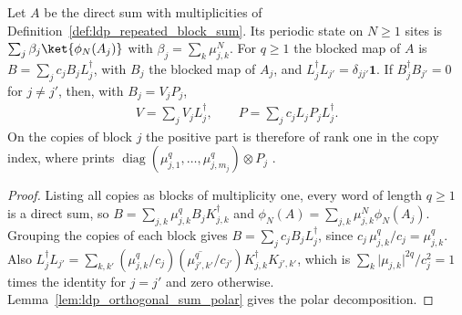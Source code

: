 \begin{lemma}
    \label{thm:ldp_repeated_block_polar}
    \leanok
    Let $A$ be the direct sum with multiplicities of
    Definition~\ref{def:ldp_repeated_block_sum}. Its periodic state on $N\geq1$
    sites is $\sum_j\beta_j\ket{\phi_N(A_j)}$ with $\beta_j=\sum_k\mu_{j,k}^N$.
    For $q\geq1$ the blocked map of $A$ is $B=\sum_jc_jB_jL_j^\dagger$, with
    $B_j$ the blocked map of $A_j$, and $L_j^\dagger L_{j'}=\delta_{jj'}\mathbf 1$.
    If $B_j^\dagger B_{j'}=0$ for $j\neq j'$, then, with $B_j=V_jP_j$,
    \begin{align*}
        V=\sum_jV_jL_j^\dagger,\qquad P=\sum_jc_jL_jP_jL_j^\dagger.
    \end{align*}
    On the copies of block $j$ the positive part is therefore of rank one in
    the copy index, where \cite[eq.~(S5)]{Malz2024Preparation} prints
    $\operatorname{diag}(\mu_{j,1}^q,\dots,\mu_{j,m_j}^q)\otimes P_j$
    \cite{gap:mswc24_repeated_block_corrected_state}.
\end{lemma}
\begin{proof}
    \leanok
    Listing all copies as blocks of multiplicity one, every word of length
    $q\geq1$ is a direct sum, so $B=\sum_{j,k}\mu_{j,k}^qB_jK_{j,k}^\dagger$ and
    $\phi_N(A)=\sum_{j,k}\mu_{j,k}^N\phi_N(A_j)$. Grouping the copies of each
    block gives $B=\sum_jc_jB_jL_j^\dagger$, since
    $c_j\,\mu_{j,k}^q/c_j=\mu_{j,k}^q$. Also
    $L_j^\dagger L_{j'}=\sum_{k,k'}(\mu_{j,k}^q/c_j)
        (\overline{\mu_{j',k'}^q}/c_{j'})K_{j,k}^\dagger K_{j',k'}$, which is
    $\sum_k\lvert\mu_{j,k}\rvert^{2q}/c_j^2=1$ times the identity for $j=j'$ and
    zero otherwise. Lemma~\ref{lem:ldp_orthogonal_sum_polar} gives the polar
    decomposition.
\end{proof}

